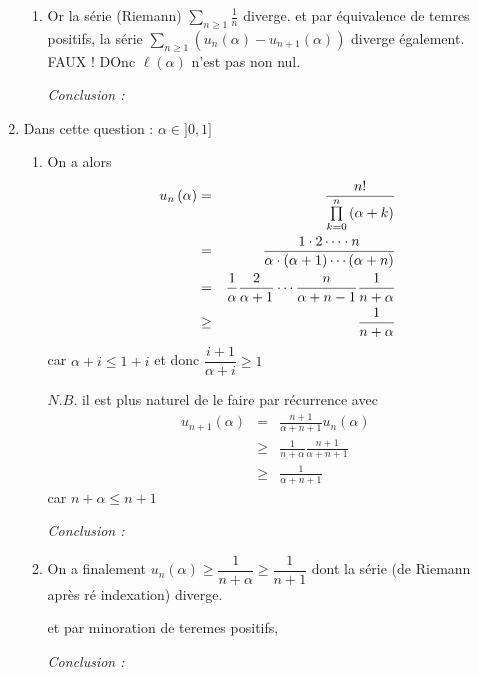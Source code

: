 \documentclass[a4paper, 11pt,reqno]{article}
\begin{document}
\begin{enumerate}
\begin{enumerate}
\item Or la s\'{e}rie (Riemann) $\sum_{n\geq 1}\frac{1}{n}$ diverge. et par 
\'{e}quivalence de temres positifs, la s\'{e}rie $\sum_{n\geq 1}\left(
u_{n}\left( \alpha \right) -u_{n+1}\left( \alpha \right) \right) $ diverge 
\'{e}galement. FAUX ! DOnc $\ell \left( \alpha \right) $ n'est pas non nul.

\textsl{Conclusion : }
\end{enumerate}

\item Dans cette question : $\alpha \in ]0,1]$

\begin{enumerate}
\item On a alors 
\begin{eqnarray*}
\mathbb{\;}u_{n}\left( \alpha \right)  &=&\frac{n!}{\prod\limits_{k=0}^{n}%
\left( \alpha +k\right) } \\
&=&\frac{1\cdot 2\cdots \cdot n}{\alpha \cdot \left( \alpha +1\right) \cdots
\left( \alpha +n\right) } \\
&=&\frac{1}{\alpha }\frac{2}{\alpha +1}\cdots \frac{n}{\alpha +n-1}\frac{1}{%
n+\alpha } \\
&\geq &\frac{1}{n+\alpha }
\end{eqnarray*}%
car $\alpha +i\leq 1+i$ et donc $\dfrac{i+1}{\alpha +i}\geq 1$

$N.B.$ il est plus naturel de le faire par r\'{e}currence avec 
\begin{eqnarray*}
u_{n+1}\left( \alpha \right)  &=&\frac{n+1}{\alpha +n+1}u_{n}\left( \alpha
\right)  \\
&\geq &\frac{1}{n+\alpha }\frac{n+1}{\alpha +n+1} \\
&\geq &\frac{1}{\alpha +n+1}
\end{eqnarray*}%
car $n+\alpha \leq n+1$

\textsl{Conclusion : }

\item On a finalement $u_{n}\left( \alpha \right) \geq \dfrac{1}{n+\alpha }%
\geq \dfrac{1}{n+1}$ dont la s\'{e}rie (de Riemann apr\`{e}s r\'{e}%
indexation) diverge.

et par minoration de teremes positifs, 

\textsl{Conclusion : }
\end{enumerate}


\end{enumerate}
\end{document}
